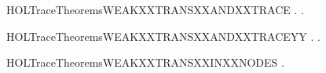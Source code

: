 \newcommand{\HOLTraceTheoremsUNIQUEXXLABELXXNOTXXNULL}{\UseVerbatim{HOLTraceTheoremsUNIQUEXXLABELXXNOTXXNULL}}
\begin{SaveVerbatim}{HOLTraceTheoremsWEAKXXTRANSXXANDXXTRACE}
\HOLTokenTurnstile{} \HOLSymConst{\HOLTokenForall{}}  .
        \HOLTokenWeakTransBegin{}\HOLTokenWeakTransEnd {} \HOLSymConst{\HOLTokenEquiv{}}
       \HOLSymConst{\HOLTokenExists{}}.
               \HOLSymConst{\HOLTokenConj{}} \HOLSymConst{\HOLTokenNeg{}}  \HOLSymConst{\HOLTokenConj{}}
             \HOLSymConst{\ensuremath{=}} \HOLConst{\ensuremath{\tau}}       
\end{SaveVerbatim}
\newcommand{\HOLTraceTheoremsWEAKXXTRANSXXANDXXTRACE}{\UseVerbatim{HOLTraceTheoremsWEAKXXTRANSXXANDXXTRACE}}
\begin{SaveVerbatim}{HOLTraceTheoremsWEAKXXTRANSXXANDXXTRACEYY}
\HOLTokenTurnstile{} \HOLSymConst{\HOLTokenForall{}}  .
        \HOLTokenWeakTransBegin{}\HOLTokenWeakTransEnd {} \HOLSymConst{\HOLTokenEquiv{}}
       \HOLSymConst{\HOLTokenExists{}}.
               \HOLSymConst{\HOLTokenConj{}} \HOLSymConst{\HOLTokenNeg{}}  \HOLSymConst{\HOLTokenConj{}}
             \HOLSymConst{\ensuremath{=}} \HOLConst{\ensuremath{\tau}}       
\end{SaveVerbatim}
\newcommand{\HOLTraceTheoremsWEAKXXTRANSXXANDXXTRACEYY}{\UseVerbatim{HOLTraceTheoremsWEAKXXTRANSXXANDXXTRACEYY}}
\begin{SaveVerbatim}{HOLTraceTheoremsWEAKXXTRANSXXINXXNODES}
\HOLTokenTurnstile{} \HOLSymConst{\HOLTokenForall{}}  .  \HOLTokenWeakTransBegin{}\HOLTokenWeakTransEnd {} \HOLSymConst{\HOLTokenImp{}}  \HOLConst{\HOLTokenIn{}}  
\end{SaveVerbatim}
